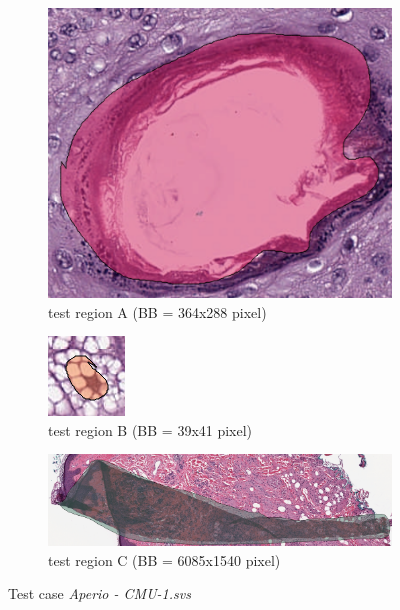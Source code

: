 \begin{figure}[!h]
	\begin{subfigure}{.6\textwidth}
		\centering
		\includegraphics[width=.8\linewidth]{img/ts_test/region1.png}
		\caption{test region A (BB = 364x288 pixel)}
		\label{fig5_sample:1}
	\end{subfigure}%
	\begin{subfigure}{.2\textwidth}
		\centering
		\includegraphics[width=.8\linewidth]{img/ts_test/region3.png}
		\caption{test region B (BB = 39x41 pixel)}
		\label{fig5_sample:3}
	\end{subfigure}
	\begin{subfigure}{1\textwidth}
		\centering
		\includegraphics[width=1\linewidth]{img/ts_test/region2.png}
		\caption{test region C (BB = 6085x1540 pixel)}
		\label{fig5_sample:2}
	\end{subfigure}
	\caption{Test case \emph{Aperio - CMU-1.svs}}
	\label{fig5_sample}
\end{figure}
\clearpage

